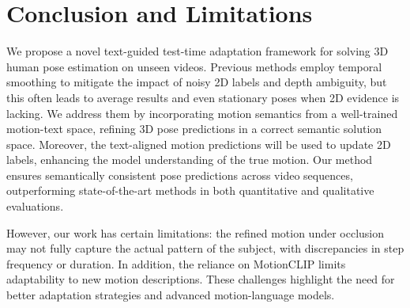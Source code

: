 \section{Conclusion and Limitations}
\label{sec:conclusion}
We propose a novel text-guided test-time adaptation framework for solving 3D human pose estimation on unseen videos. 
Previous methods employ temporal smoothing to
mitigate the impact of noisy 2D labels and depth ambiguity,
but this often leads to average results and even stationary poses
when 2D evidence is lacking. 
We address them by incorporating motion semantics from a well-trained motion-text space, refining 3D pose predictions in a correct semantic solution space.  
Moreover, the text-aligned motion predictions will be used to update 2D labels, enhancing the model understanding of the true motion.
Our method ensures semantically consistent pose predictions across video sequences, outperforming state-of-the-art methods in both quantitative and qualitative evaluations. 

However, our work has certain limitations: the refined motion under occlusion may not fully capture the actual pattern of the subject, with discrepancies in step frequency or duration.
In addition, the reliance on MotionCLIP limits adaptability to new motion descriptions. These challenges highlight the need for better adaptation strategies and advanced motion-language models. 
